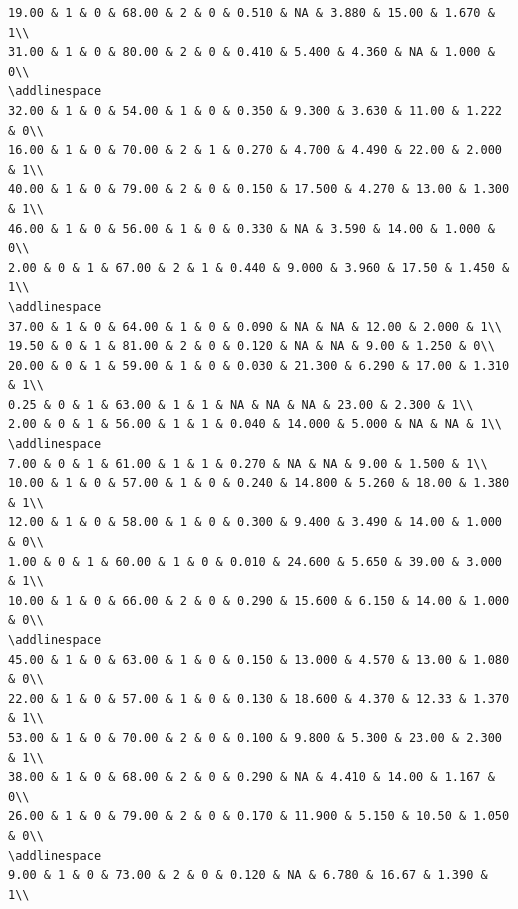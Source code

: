 \documentclass[
]{article}
\begin{document}
\begin{verbatim}
19.00 & 1 & 0 & 68.00 & 2 & 0 & 0.510 & NA & 3.880 & 15.00 & 1.670 & 1\\
31.00 & 1 & 0 & 80.00 & 2 & 0 & 0.410 & 5.400 & 4.360 & NA & 1.000 & 0\\
\addlinespace
32.00 & 1 & 0 & 54.00 & 1 & 0 & 0.350 & 9.300 & 3.630 & 11.00 & 1.222 & 0\\
16.00 & 1 & 0 & 70.00 & 2 & 1 & 0.270 & 4.700 & 4.490 & 22.00 & 2.000 & 1\\
40.00 & 1 & 0 & 79.00 & 2 & 0 & 0.150 & 17.500 & 4.270 & 13.00 & 1.300 & 1\\
46.00 & 1 & 0 & 56.00 & 1 & 0 & 0.330 & NA & 3.590 & 14.00 & 1.000 & 0\\
2.00 & 0 & 1 & 67.00 & 2 & 1 & 0.440 & 9.000 & 3.960 & 17.50 & 1.450 & 1\\
\addlinespace
37.00 & 1 & 0 & 64.00 & 1 & 0 & 0.090 & NA & NA & 12.00 & 2.000 & 1\\
19.50 & 0 & 1 & 81.00 & 2 & 0 & 0.120 & NA & NA & 9.00 & 1.250 & 0\\
20.00 & 0 & 1 & 59.00 & 1 & 0 & 0.030 & 21.300 & 6.290 & 17.00 & 1.310 & 1\\
0.25 & 0 & 1 & 63.00 & 1 & 1 & NA & NA & NA & 23.00 & 2.300 & 1\\
2.00 & 0 & 1 & 56.00 & 1 & 1 & 0.040 & 14.000 & 5.000 & NA & NA & 1\\
\addlinespace
7.00 & 0 & 1 & 61.00 & 1 & 1 & 0.270 & NA & NA & 9.00 & 1.500 & 1\\
10.00 & 1 & 0 & 57.00 & 1 & 0 & 0.240 & 14.800 & 5.260 & 18.00 & 1.380 & 1\\
12.00 & 1 & 0 & 58.00 & 1 & 0 & 0.300 & 9.400 & 3.490 & 14.00 & 1.000 & 0\\
1.00 & 0 & 1 & 60.00 & 1 & 0 & 0.010 & 24.600 & 5.650 & 39.00 & 3.000 & 1\\
10.00 & 1 & 0 & 66.00 & 2 & 0 & 0.290 & 15.600 & 6.150 & 14.00 & 1.000 & 0\\
\addlinespace
45.00 & 1 & 0 & 63.00 & 1 & 0 & 0.150 & 13.000 & 4.570 & 13.00 & 1.080 & 0\\
22.00 & 1 & 0 & 57.00 & 1 & 0 & 0.130 & 18.600 & 4.370 & 12.33 & 1.370 & 1\\
53.00 & 1 & 0 & 70.00 & 2 & 0 & 0.100 & 9.800 & 5.300 & 23.00 & 2.300 & 1\\
38.00 & 1 & 0 & 68.00 & 2 & 0 & 0.290 & NA & 4.410 & 14.00 & 1.167 & 0\\
26.00 & 1 & 0 & 79.00 & 2 & 0 & 0.170 & 11.900 & 5.150 & 10.50 & 1.050 & 0\\
\addlinespace
9.00 & 1 & 0 & 73.00 & 2 & 0 & 0.120 & NA & 6.780 & 16.67 & 1.390 & 1\\

\end{verbatim}
\end{document}

